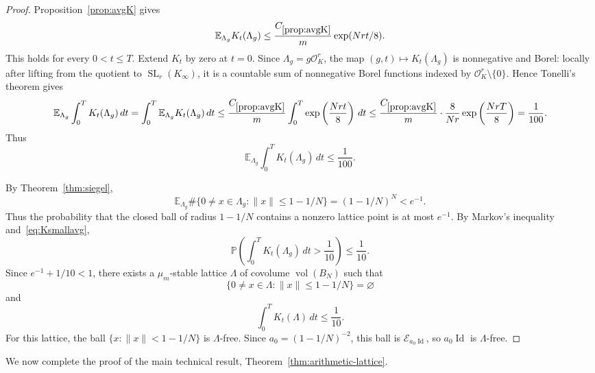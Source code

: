 \documentclass[11pt]{article}
\theoremstyle{remark}
\newcommand{\OK}{\mathcal O_K}
\newcommand{\vol}{\operatorname{vol}}
\newcommand{\Id}{\operatorname{Id}}
\newcommand{\E}{\mathbb E}
\newcommand{\Prob}{\mathbb P}
\newcommand{\calE}{\mathcal E}
\begin{document}
\begin{proof}
Proposition~\ref{prop:avgK} gives
\[
        \E_{\Lambda_g}K_t(\Lambda_g)
        \le \frac{C_{\ref{prop:avgK}}}{m}\exp(Nrt/8).
\]
This holds for every $0<t\le T$.
Extend $K_t$ by zero at $t=0$.  Since $\Lambda_g=g\OK^r$, the map
$(g,t)\mapsto K_t(\Lambda_g)$ is nonnegative and Borel: locally after lifting
from the quotient to $\operatorname{SL}_r(K_\infty)$, it is a
countable sum of nonnegative Borel functions indexed by
$\OK^r\setminus\{0\}$.  Hence Tonelli's theorem gives
\[
        \E_{\Lambda_g}\int_0^T K_t(\Lambda_g)\,dt
        =\int_0^T\E_{\Lambda_g}K_t(\Lambda_g)\,dt
        \le \frac{C_{\ref{prop:avgK}}}{m}\int_0^T
        \exp\left(\frac{Nrt}{8}\right)\,dt
        \le \frac{C_{\ref{prop:avgK}}}{m}\cdot\frac8{Nr}
        \exp\left(\frac{NrT}{8}\right)=\frac1{100}.
\]
Thus
\begin{equation}
        \E_{\Lambda_g}\int_0^T K_t(\Lambda_g)\,dt\le\frac1{100}.
\label{eq:Ksmallavg}
\end{equation}

By Theorem~\ref{thm:siegel},
\[
        \E_{\Lambda_g}
        \#\{0\ne x\in\Lambda_g:\|x\|\le1-1/N\}
        =(1-1/N)^N<e^{-1}.
\]
Thus the probability that the closed ball of radius $1-1/N$ contains a nonzero
lattice point is at most $e^{-1}$.  By Markov's inequality
and~\eqref{eq:Ksmallavg},
\[
        \Prob\left(\int_0^T K_t(\Lambda_g)\,dt>\frac1{10}\right)
        \le\frac1{10}.
\]
Since $e^{-1}+1/10<1$, there exists a $\mu_m$-stable lattice $\Lambda$ of
covolume $\vol(B_N)$ such that
\[
        \{0\ne x\in\Lambda:\|x\|\le1-1/N\}=\varnothing
\]
and
\begin{equation}
        \int_0^T K_t(\Lambda)\,dt\le\frac1{10}.
\label{eq:goodK}
\end{equation}
For this lattice, the ball $\{x:\|x\|<1-1/N\}$ is $\Lambda$-free.  Since
$a_0=(1-1/N)^{-2}$, this ball is $\calE_{a_0\Id}$, so $a_0\Id$ is
$\Lambda$-free.

\end{proof}

We now complete the proof of the main technical result,
Theorem~\ref{thm:arithmetic-lattice}.
\end{document}
